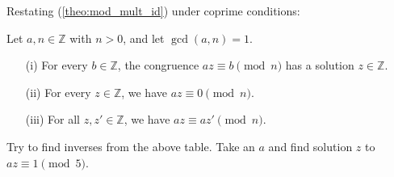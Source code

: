 \noindent
Restating (\ref{theo:mod_mult_id}) under coprime conditions:
\begin{theo}
    

        \label{theo:co_mod_mult_id}
        
    Let \(a, n \in \mathbb{Z}\) with \(n > 0\), and let \(\gcd(a, n)=1\).
    \begin{itemize}
        \item[(i)] For every \(b \in \mathbb{Z}\), the congruence \(az \equiv b \pmod{n}\) has a solution \(z \in \mathbb{Z}\).
        
        \item[(ii)] For every \(z \in \mathbb{Z}\), we have \(az \equiv 0 \pmod{n}\).
        
        \item[(iii)] For all \(z, z' \in \mathbb{Z}\), we have \(az \equiv az' \pmod{n}\). 
    \end{itemize}
    \noindent
\end{theo}
Try to find inverses from the above table. Take an $a$ and find solution $z$ to $az\equiv1\pmod{5}$.

\newpage









